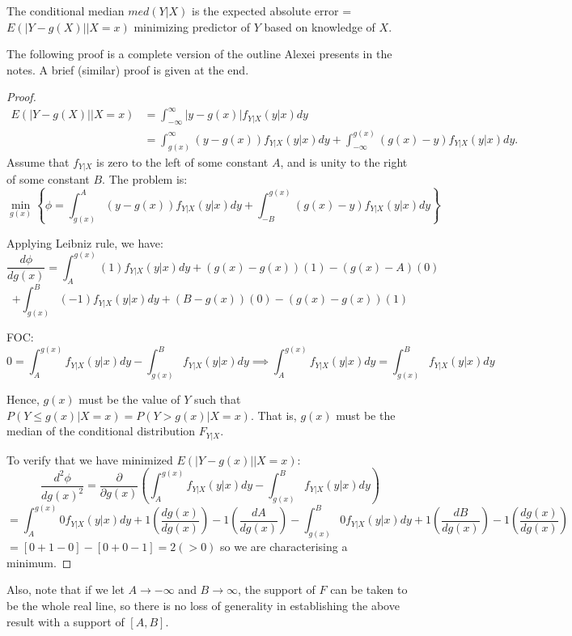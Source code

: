 \documentclass[DIV=14,titlepage=false]{scrreprt}
\begin{document}
\begin{theorem}
  The conditional median $med(Y|X)$ is the expected absolute error = $E(|Y - g(X)||X = x)$ minimizing predictor of $ Y $ based on knowledge of $ X $.
\end{theorem}
The following proof is a complete version of the outline Alexei presents in the notes. A brief (similar) proof is given at the end.\\
\begin{proof}
\begin{align*}
  E(|Y - g(X)||X = x) &= \int_{-\infty}^{\infty} |y - g(x)| f_{Y|X}(y|x) dy\\
  &= \int_{g(x)}^{\infty} (y - g(x)) f_{Y|X}(y|x) dy + \int_{-\infty}^{g(x)} (g(x) - y) f_{Y|X}(y|x) dy.
\end{align*}
Assume that \( f_{Y|X} \) is zero to the left of some constant \( A \), and is unity to the right of some constant \( B \). The problem is: 
\[ \min_{g(x)} \left\{ \phi = \int_{g(x)}^{A} (y - g(x)) f_{Y|X}(y|x) dy + \int_{-B}^{g(x)} (g(x) - y) f_{Y|X}(y|x) dy \right\} \]

Applying Leibniz rule, we have:
\[
\frac{d\phi}{dg(x)} = \int_{A}^{g(x)} (1) f_{Y|X}(y|x) dy + (g(x) - g(x))(1) - (g(x)-A)(0)\]
\[+ \int_{g(x)}^{B} (-1)f_{Y|X}(y|x) dy + (B-g(x))(0) - (g(x)-g(x))(1)
\]

FOC: 
\[
0 =  \int_{A}^{g(x)}f_{Y|X}(y|x) dy -\int_{g(x)}^{B}f_{Y|X}(y|x) dy \implies \int_{A}^{g(x)}f_{Y|X}(y|x) dy = \int_{g(x)}^{B}f_{Y|X}(y|x) dy
\]

Hence, \( g(x) \) must be the value of \( Y \) such that \( P(Y \leq g(x)|X = x) = P(Y > g(x)|X = x) \). That is, \( g(x) \) must be the median of the conditional distribution \( F_{Y|X} \).

To verify that we have minimized \( E(|Y - g(x)||X = x) \):
\[
\frac{d^2\phi}{dg(x)^2} = \frac{\partial}{\partial g(x)} \left( \int_{A}^{g(x)}f_{Y|X}(y|x) dy -\int_{g(x)}^{B}f_{Y|X}(y|x) dy \right)
\]
\[
= \int_{A}^{g(x)} 0f_{Y|X}(y|x) dy + 1\left(\frac{dg(x)}{dg(x)}\right) - 1\left(\frac{dA}{dg(x)}\right)  - \int_{g(x)}^{B} 0f_{Y|X}(y|x) dy + 1\left(\frac{dB}{dg(x)}\right) - 1\left(\frac{dg(x)}{dg(x)}\right)
\]
$=[0+1-0]-[0+0-1]=2(>0)$ so we are characterising a minimum.
\end{proof}
Also, note that if we let \( A \to -\infty \) and \( B \to \infty \), the support of \( F \) can be taken to be the whole real line, so there is no loss of generality in establishing the above result with a support of \( [A, B] \).\\
\end{document}
